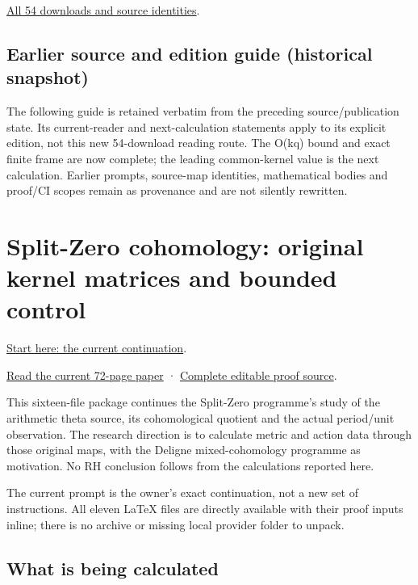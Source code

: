 \documentclass[
]{article}
\begin{document}
\href{calculation_edition_20260914_original_kernel_matrices/README.md}{All
54 downloads and source identities}.

\subsection{Earlier source and edition guide (historical
snapshot)}\label{earlier-source-and-edition-guide-historical-snapshot-14}

The following guide is retained verbatim from the preceding
source/publication state. Its current-reader and next-calculation
statements apply to its explicit edition, not this new 54-download
reading route. The O(kq) bound and exact finite frame are now complete;
the leading common-kernel value is the next calculation. Earlier
prompts, source-map identities, mathematical bodies and proof/CI scopes
remain as provenance and are not silently rewritten.

\section{Split-Zero cohomology: original kernel matrices and bounded
control}\label{split-zero-cohomology-original-kernel-matrices-and-bounded-control}

\href{workbenches/splitzero-tandem/continuations/20260914-original-kernel-matrices/00_CONTINUE_HERE.md}{Start
here: the current continuation}.

\href{workbenches/splitzero-tandem/continuations/20260914-original-kernel-matrices/15_CURRENT_MIXED_CONTROL_READER.pdf}{Read
the current 72-page paper} ·
\href{workbenches/splitzero-tandem/continuations/20260914-original-kernel-matrices/14_CURRENT_KERNEL_AND_MULTIPLICITY_PROOFS.tex}{Complete
editable proof source}.

This sixteen-file package continues the Split-Zero programme's study of
the arithmetic theta source, its cohomological quotient and the actual
period/unit observation. The research direction is to calculate metric
and action data through those original maps, with the Deligne
mixed-cohomology programme as motivation. No RH conclusion follows from
the calculations reported here.

The current prompt is the owner's exact continuation, not a new set of
instructions. All eleven LaTeX files are directly available with their
proof inputs inline; there is no archive or missing local provider
folder to unpack.

\subsection{What is being calculated}\label{what-is-being-calculated}
\end{document}
